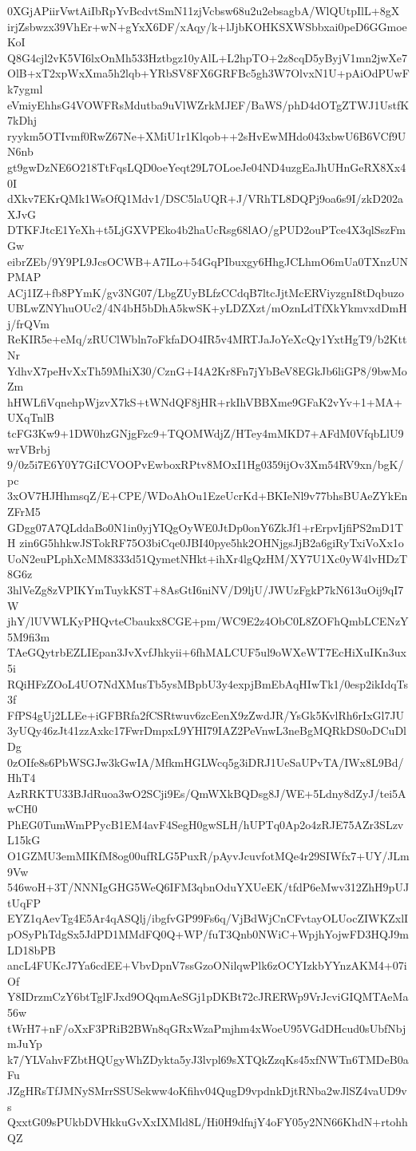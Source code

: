 0XGjAPiirVwtAiIbRpYvBcdvtSmN11zjVcbsw68u2u2ebsagbA/WlQUtpIlL+8gX
irjZsbwzx39VhEr+wN+gYxX6DF/xAqy/k+lJjbKOHKSXWSbbxai0peD6GGmoeKoI
Q8G4cjl2vK5VI6lxOnMh533Hztbgz10yAlL+L2hpTO+2z8cqD5yByjV1mn2jwXe7
OlB+xT2xpWxXma5h2lqb+YRbSV8FX6GRFBc5gh3W7OlvxN1U+pAiOdPUwFk7ygml
eVmiyEhhsG4VOWFRsMdutba9uVlWZrkMJEF/BaWS/phD4dOTgZTWJ1UstfK7kDhj
ryykm5OTIvmf0RwZ67Ne+XMiU1r1Klqob++2sHvEwMHdo043xbwU6B6VCf9UN6nb
gt9gwDzNE6O218TtFqsLQD0oeYeqt29L7OLoeJe04ND4uzgEaJhUHnGeRX8Xx40I
dXkv7EKrQMk1WsOfQ1Mdv1/DSC5laUQR+J/VRhTL8DQPj9oa6s9I/zkD202aXJvG
DTKFJtcE1YeXh+t5LjGXVPEko4b2haUcRsg68lAO/gPUD2ouPTce4X3qlSszFmGw
eibrZEb/9Y9PL9JcsOCWB+A7ILo+54GqPIbuxgy6HhgJCLhmO6mUa0TXnzUNPMAP
ACj1IZ+fb8PYmK/gv3NG07/LbgZUyBLfzCCdqB7ltcJjtMcERViyzgnI8tDqbuzo
UBLwZNYhuOUc2/4N4bH5bDhA5kwSK+yLDZXzt/mOznLdTfXkYkmvxdDmHj/frQVm
ReKIR5e+eMq/zRUClWbln7oFkfaDO4IR5v4MRTJaJoYeXcQy1YxtHgT9/b2KttNr
YdhvX7peHvXxTh59MhiX30/CznG+I4A2Kr8Fn7jYbBeV8EGkJb6liGP8/9bwMoZm
hHWLfiVqnehpWjzvX7kS+tWNdQF8jHR+rkIhVBBXme9GFaK2vYv+1+MA+UXqTnlB
tcFG3Kw9+1DW0hzGNjgFzc9+TQOMWdjZ/HTey4mMKD7+AFdM0VfqbLlU9wrVBrbj
9/0z5i7E6Y0Y7GiICVOOPvEwboxRPtv8MOxI1Hg0359ijOv3Xm54RV9xn/bgK/pc
3xOV7HJHhmsqZ/E+CPE/WDoAhOu1EzeUcrKd+BKIeNl9v77bhsBUAeZYkEnZFrM5
GDgg07A7QLddaBo0N1in0yjYIQgOyWE0JtDp0onY6ZkJf1+rErpvIjfiPS2mD1TH
zin6G5hhkwJSTokRF75O3biCqe0JBI40pye5hk2OHNjgsJjB2a6giRyTxiVoXx1o
UoN2euPLphXcMM8333d51QymetNHkt+ihXr4lgQzHM/XY7U1Xc0yW4lvHDzT8G6z
3hlVeZg8zVPIKYmTuykKST+8AsGtI6niNV/D9ljU/JWUzFgkP7kN613uOij9qI7W
jhY/lUVWLKyPHQvteCbaukx8CGE+pm/WC9E2z4ObC0L8ZOFhQmbLCENzY5M9fi3m
TAeGQytrbEZLIEpan3JvXvfJhkyii+6fhMALCUF5ul9oWXeWT7EcHiXuIKn3ux5i
RQiHFzZOoL4UO7NdXMusTb5ysMBpbU3y4expjBmEbAqHIwTk1/0esp2ikIdqTs3f
FfPS4gUj2LLEe+iGFBRfa2fCSRtwuv6zcEenX9zZwdJR/YsGk5KvlRh6rIxGl7JU
3yUQy46zJt41zzAxkc17FwrDmpxL9YHI79IAZ2PeVnwL3neBgMQRkDS0oDCuDlDg
0zOIfe8s6PbWSGJw3kGwIA/MfkmHGLWcq5g3iDRJ1UeSaUPvTA/IWx8L9Bd/HhT4
AzRRKTU33BJdRuoa3wO2SCji9Es/QmWXkBQDsg8J/WE+5Ldny8dZyJ/tei5AwCH0
PhEG0TumWmPPycB1EM4avF4SegH0gwSLH/hUPTq0Ap2o4zRJE75AZr3SLzvL15kG
O1GZMU3emMIKfM8og00ufRLG5PuxR/pAyvJcuvfotMQe4r29SIWfx7+UY/JLm9Vw
546woH+3T/NNNIgGHG5WeQ6IFM3qbnOduYXUeEK/tfdP6eMwv312ZhH9pUJtUqFP
EYZ1qAevTg4E5Ar4qASQlj/ibgfvGP99Fs6q/VjBdWjCnCFvtayOLUocZIWKZxlI
pOSyPhTdgSx5JdPD1MMdFQ0Q+WP/fuT3Qnb0NWiC+WpjhYojwFD3HQJ9mLD18bPB
ancL4FUKcJ7Ya6cdEE+VbvDpnV7ssGzoONilqwPlk6zOCYIzkbYYnzAKM4+07iOf
Y8IDrzmCzY6btTglFJxd9OQqmAeSGj1pDKBt72cJRERWp9VrJcviGIQMTAeMa56w
tWrH7+nF/oXxF3PRiB2BWn8qGRxWzaPmjhm4xWoeU95VGdDHcud0sUbfNbjmJuYp
k7/YLVahvFZbtHQUgyWhZDykta5yJ3lvpl69sXTQkZzqKs45xfNWTn6TMDeB0aFu
JZgHRsTfJMNySMrrSSUSekww4oKfihv04QugD9vpdnkDjtRNba2wJlSZ4vaUD9vs
QxxtG09sPUkbDVHkkuGvXxIXMld8L/Hi0H9dfnjY4oFY05y2NN66KhdN+rtohhQZ
